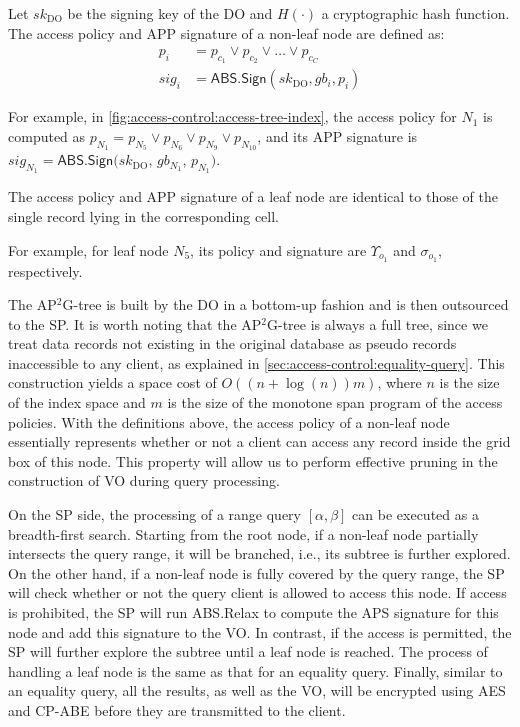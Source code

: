\begin{definition}
  Let ${sk}_{\textrm{DO}}$ be the signing key of the DO and $H(\cdot)$ a cryptographic hash function. The access policy and APP signature of a non-leaf node are defined as:
  \begin{align*}
    p_i   & = p_{c_1}  \lor  p_{c_2}  \lor  \dots  \lor  p_{c_C} \\
    sig_i & = \textsf{ABS.Sign}({sk}_{\textrm{DO}}, gb_i , p_i)
  \end{align*}
\end{definition}
For example, in \cref{fig:access-control:access-tree-index}, the access policy for $N_1$ is computed as $p_{N_1} = p_{N_5} \lor p_{N_6} \lor p_{N_9} \lor p_{N_{10}}$, and its APP signature is $sig_{N_1} = \textsf{ABS.Sign}({sk}_{\textrm{DO}}$, $gb_{N_1}$, $p_{N_1})$.

\begin{definition}
  The access policy and APP signature of a leaf node are identical to those of the single record lying in the corresponding cell.
\end{definition}
For example, for leaf node $N_5$, its policy and signature are $\Upsilon_{o_1}$ and $\sigma_{o_1}$, respectively.

The AP$^2$G-tree is built by the DO in a bottom-up fashion and is then outsourced to the SP\@.
It is worth noting that the AP$^2$G-tree is always a full tree, since we treat data records not existing in the original database as pseudo records inaccessible to any client, as explained in \cref{sec:access-control:equality-query}. This construction yields a space cost of $O((n + \log(n))m)$, where $n$ is the size of the index space and $m$ is the size of the monotone span program of the access policies. With the definitions above, the access policy of a non-leaf node essentially represents whether or not a client can access any record inside the grid box of this node. This property will allow us to perform effective pruning in the construction of VO during query processing.

On the SP side, the processing of a range query $[\alpha,\beta]$ can be executed as a breadth-first search. Starting from the root node, if a non-leaf node partially intersects the query range, it will be branched, i.e., its subtree is further explored. On the other hand, if a non-leaf node is fully covered by the query range, the SP will check whether or not the query client is allowed to access this node. If access is prohibited, the SP will run \textsf{ABS.Relax} to compute the APS signature for this node and add this signature to the VO\@. In contrast, if the access is permitted, the SP will further explore the subtree until a leaf node is reached. The process of handling a leaf node is the same as that for an equality query. Finally, similar to an equality query, all the results, as well as the VO, will be encrypted using AES and CP-ABE before they are transmitted to the client.

